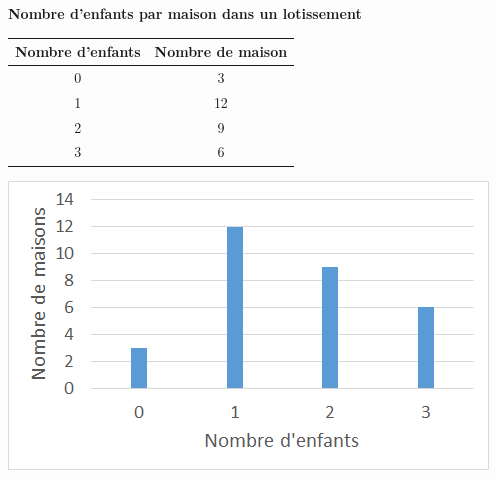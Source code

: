 
\begin{myex}
	
	\textbf{Nombre d'enfants par maison dans un lotissement}
	
	\begin{multicols*}{2}
		
		\begin{center}
			\begin{tabular}{|@{\ }c@{\ }|@{\ }c@{\ }|}
				\hline
				Nombre d'enfants & Nombre de maison \\ \hline
				0 & 3  \\ \hline
				1 & 12 \\ \hline
				2 & 9 \\ \hline
				3 & 6 \\ \hline
			\end{tabular}
		\end{center}
		
		
		\includegraphics[scale=0.8]{img/barres}
	\end{multicols*}
	
\end{myex}


